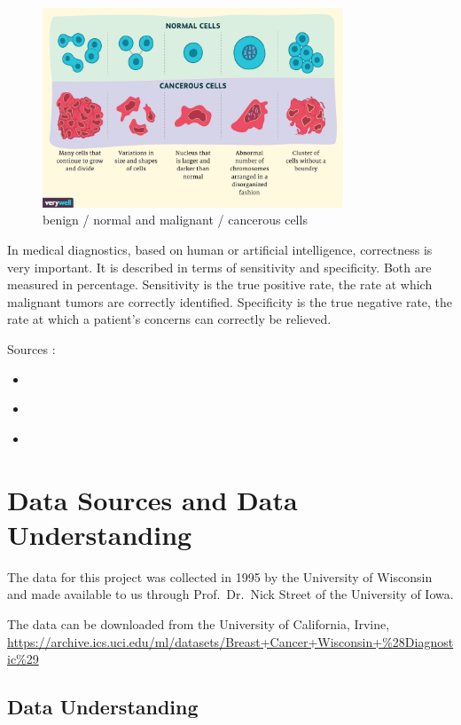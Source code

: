 \documentclass[]{article}
\begin{document}
\begin{figure}
    \centering
    \includegraphics[width=0.8\textwidth]{images/normal-vs-cancerous-cells.png}
    \caption{benign / normal and malignant / cancerous  cells}
    \label{fig:normal-vs-cancer}
\end{figure}

In medical diagnostics, based on human or artificial intelligence,
correctness is very important. It is described in terms of sensitivity
and specificity. Both are measured in percentage. Sensitivity is the
true positive rate, the rate at which malignant tumors are correctly
identified. Specificity is the true negative rate, the rate at which a
patient's concerns can correctly be relieved.

Sources :

\begin{itemize}
\item
  \cite{rki}
\item
  \cite{malignant-and-benign}
\item
  \cite{cancer-cells-vs-normal}
\end{itemize}

\section{Data Sources and Data
Understanding}\label{data-sources-and-data-understanding}

The data for this project was collected in 1995 by the University of
Wisconsin and made available to us through Prof.~Dr.~Nick Street of the
University of Iowa.

The data can be downloaded from the University of California, Irvine,
\url{https://archive.ics.uci.edu/ml/datasets/Breast+Cancer+Wisconsin+\%28Diagnostic\%29}

\subsection{Data Understanding}\label{data-understanding}
\end{document}
